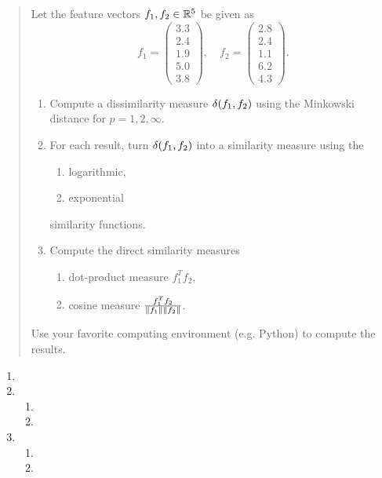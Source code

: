 \documentclass[english]{exercise}
\begin{document}
    \begin{quote}
        Let the feature vectors \(f_1, f_2 \in \R^5\) be given as
        \[
            f_1 = \begin{pmatrix}
                3.3\\
                2.4\\
                1.9\\
                5.0\\
                3.8
            \end{pmatrix}, \quad f_2 = \begin{pmatrix}
                2.8\\
                2.4\\
                1.1\\
                6.2\\
                4.3
            \end{pmatrix}.
        \]
        \begin{enumerate}
            \item Compute a dissimilarity measure \(\delta\parentheses*{f_1, f_2}\) using the Minkowski distance for \(p = 1, 2, \infty\).
            \item For each result, turn \(\delta\parentheses*{f_1, f_2}\) into a similarity measure using the
            \begin{enumerate}
                \item logarithmic,
                \item exponential
            \end{enumerate}
            similarity functions.
            \item Compute the direct similarity measures
            \begin{enumerate}
                \item dot-product measure \(f_1^T f_2\),
                \item cosine measure \(\frac{f_1^T f_2}{\norm*{f_1}\norm*{f_2}}\).
            \end{enumerate}
        \end{enumerate}
        Use your favorite computing environment (e.g. Python) to compute the results.
    \end{quote}
    
    \begin{enumerate}
        \item
        \item
        \begin{enumerate}
            \item
            \item
        \end{enumerate}
        \item
        \begin{enumerate}
            \item
            \item
        \end{enumerate}
    \end{enumerate}
    
\end{document}
